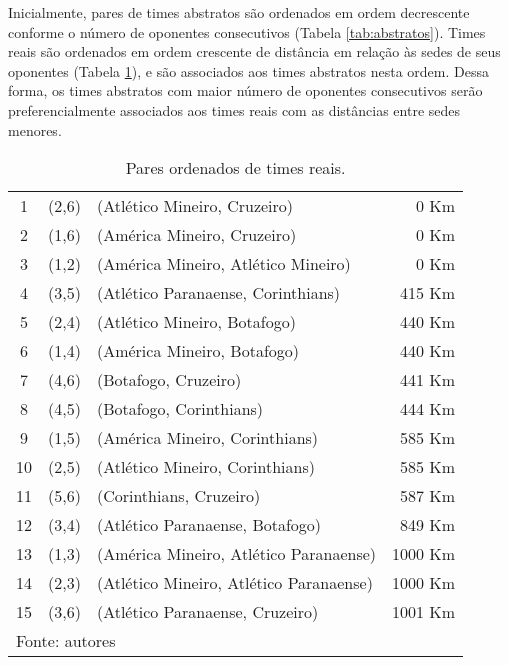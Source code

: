 \documentclass[12pt,a4paper]{article}
\renewcommand*{\arraystretch}{1.2}
\numberwithin{figure}{section}
\numberwithin{table}{section}
\begin{document}
Inicialmente, pares de times abstratos são ordenados em ordem decrescente conforme o número de oponentes consecutivos (Tabela \ref{tab:abstratos}). Times reais são ordenados em ordem crescente de distância em relação às sedes de seus oponentes (Tabela \ref{tab:reais}), e são associados aos times abstratos nesta ordem. Dessa forma, os times abstratos com maior número de oponentes consecutivos serão preferencialmente associados aos times reais com as distâncias entre sedes menores.

\begin{table}[H]
	\renewcommand{\arraystretch}{1}
	\centering
	\caption{Pares ordenados de times reais.}
	\label{tab:reais}
	\begin{tabular}{cclr}
		\toprule
		 1 & (2,6) & (Atlético Mineiro, Cruzeiro) & 0 Km \\
		 2 & (1,6) & (América Mineiro, Cruzeiro) & 0 Km \\
		 3 & (1,2) & (América Mineiro, Atlético Mineiro) & 0 Km \\
		 4 & (3,5) & (Atlético Paranaense, Corinthians) & 415 Km \\
		 5 & (2,4) & (Atlético Mineiro, Botafogo) & 440 Km \\
		 6 & (1,4) & (América Mineiro, Botafogo) & 440 Km \\
		 7 & (4,6) & (Botafogo, Cruzeiro) & 441 Km \\
		 8 & (4,5) & (Botafogo, Corinthians) & 444 Km \\
		 9 & (1,5) & (América Mineiro, Corinthians) & 585 Km \\
		10 & (2,5) & (Atlético Mineiro, Corinthians) & 585 Km \\
		11 & (5,6) & (Corinthians, Cruzeiro) & 587 Km \\
		12 & (3,4) & (Atlético Paranaense, Botafogo) & 849 Km \\
		13 & (1,3) & (América Mineiro, Atlético Paranaense) & 1000 Km \\
		14 & (2,3) & (Atlético Mineiro, Atlético Paranaense) & 1000 Km \\
		15 & (3,6) & (Atlético Paranaense, Cruzeiro) & 1001 Km \\
		\bottomrule
		\multicolumn{4}{l}{\footnotesize Fonte: autores}
	\end{tabular}
\end{table}
\end{document}
